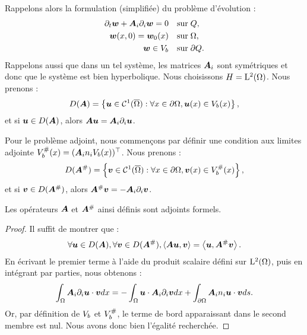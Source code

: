 Rappelons alors la formulation (simplifiée) du problème d'évolution :
\begin{subequations}
	\begin{align*}
	\partial_{t} \bm{w} + {\bm{A}_{i}\partial_{i}} \bm{w} = 0
	&\quad \mathrm{sur} \; Q ,
	\\
	\bm{w} (x, 0) = \bm{w}_0 (x)
	&\quad \mathrm{sur} \; \Omega ,
	\\
	\bm{w} \in V_b
	&\quad \mathrm{sur} \; \partial Q .
	\end{align*}
\end{subequations}
Rappelons aussi que dans un tel système, les matrices $\bm{A}_{i}$
sont symétriques et donc que le système est bien hyperbolique.
Nous choisissons $H = \mathrm{L}^2(\Omega)$.
Nous prenons :
\begin{align}
	D(\bm{A}) = \left\{ \bm{u} \in \mathcal{C}^1(\overline{\Omega}) :
	\forall x \in \partial\Omega, \bm{u}(x) \in V_b(x) \right\}
	\label{eq:domain_ope} ,
\end{align}
et si $\bm{u} \in D(\bm{A})$, alors $\bm{A} \bm{u} = {\bm{A}_{i}\partial_{i}} \bm{u}$.

Pour le problème adjoint, nous commençons par définir une condition aux limites adjointe $V_b^{\#}(x) = ({\bm{A}_{i}n_{i}} V_b(x))^\top$.
Nous prenons :
\begin{align}
	D(\bm{A}^{\#}) = \left\{ \bm{v} \in \mathcal{C}^1(\overline{\Omega}) :
	\forall x \in \partial\Omega, \bm{v}(x) \in V_b^{\#}(x) \right\}
	\label{eq:domain_ope_adj} ,
\end{align}
et si $\bm{v} \in D(\bm{A}^{\#})$, alors $\bm{A}^{\#} \bm{v} = - {\bm{A}_{i}\partial_{i}} \bm{v}$.

\begin{proposition}
	Les opérateurs $\bm{A}$ et $\bm{A}^{\#}$ ainsi définis
	sont adjoints formels.
\end{proposition}

\begin{proof}
	Il suffit de montrer que :
	\begin{align}
		\forall \bm{u} \in D(\bm{A}), \forall \bm{v} \in D(\bm{A}^{\#}),
		\left\langle \bm{A} \bm{u} , \bm{v} \right\rangle =
		\left\langle \bm{u} , \bm{A}^{\#} \bm{v} \right\rangle .
	\end{align}
	En écrivant le premier terme à l'aide du produit scalaire
	défini sur $\mathrm{L}^2(\Omega)$, puis en intégrant
	par parties, nous obtenons :
	\begin{align}
		\int_{\Omega} {\bm{A}_{i}\partial_{i}} \bm{u} \cdot \bm{v} dx =
		- \int_{\Omega} \bm{u} \cdot {\bm{A}_{i}\partial_{i}} \bm{v} dx
		+ \int_{\partial\Omega} {\bm{A}_{i}n_{i}} \bm{u} \cdot \bm{v} ds .
	\end{align}
	Or, par définition de $V_b$ et $V_b^{\#}$,
	le terme de bord apparaissant dans le second membre est nul.
	Nous avons donc bien l'égalité recherchée.
\end{proof}

